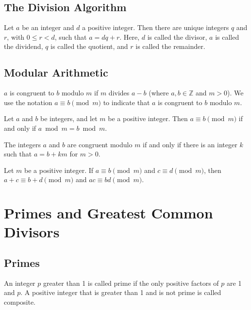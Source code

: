 \documentclass{article}
\begin{document}
\subsection{The Division Algorithm}
\begin{theorem}
    Let \( a \) be an integer and \( d \) a positive integer. Then there are unique integers \( q \) and \( r \), with \( 0 \leq r < d \), such that \( a = dq + r \).
    Here, \( d \) is called the divisor, \( a \) is called the dividend, \( q \) is called the quotient, and \( r \) is called the remainder.
\end{theorem}

\subsection{Modular Arithmetic}
\begin{definition}
    \( a \) is congruent to \( b \) modulo \( m \) if \( m \) divides \( a - b \) (where \( a, b \in \mathbb{Z} \) and \( m > 0 \)).
    We use the notation \( a \equiv b \pmod{m} \) to indicate that \( a \) is congruent to \( b \) modulo \( m \).
\end{definition}

\begin{theorem}
    Let \( a \) and \( b \) be integers, and let \( m \) be a positive integer. Then \( a \equiv b \pmod{m} \) if and only if \( a \bmod m = b \bmod m \).
\end{theorem}

\begin{theorem}
    The integers \( a \) and \( b \) are congruent modulo \( m \) if and only if there is an integer \( k \) such that \( a = b + km \) for \( m > 0 \).
\end{theorem}

\begin{theorem}
    Let \( m \) be a positive integer. If \( a \equiv b \pmod{m} \) and \( c \equiv d \pmod{m} \), then \( a + c \equiv b + d \pmod{m} \) and \( ac \equiv bd \pmod{m} \).
\end{theorem}

\section{Primes and Greatest Common Divisors}
\subsection{Primes}
\begin{proposition}
    An integer \( p \) greater than 1 is called prime if the only positive factors of \( p \) are 1 and \( p \). 
    A positive integer that is greater than 1 and is not prime is called composite.
\end{proposition}
\end{document}
